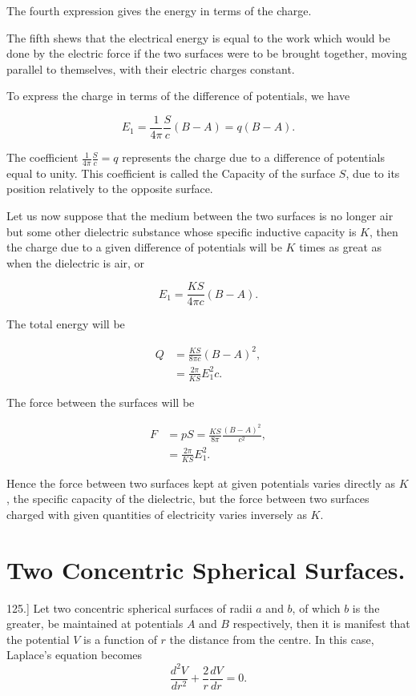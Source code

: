 \documentclass[11pt,a4paper]{article}
\begin{document}
The fourth expression gives the energy in terms of the charge.

The fifth shews that the electrical energy is equal to the work which would be done by the electric force if the two surfaces were to be brought together, moving parallel to themselves, with their electric charges constant.

To express the charge in terms of the difference of potentials, we have

\[
E_1=\frac{1}{4\pi}\frac{S}{c}(B-A)=q(B-A).
\]

The coefficient $\frac{1}{4\pi}\frac{S}{c}=q$ represents the charge due to a difference of potentials equal to unity. This coefficient is called the Capacity of the surface $S$, due to its position relatively to the opposite surface.

Let us now suppose that the medium between the two surfaces is no longer air but some other dielectric substance whose specific inductive capacity is $K$, then the charge due to a given difference of potentials will be $K$ times as great as when the dielectric is air, or

\[
E_1=\frac{KS}{4\pi c}(B-A).
\]

The total energy will be

\[
\begin{aligned}
Q&=\frac{KS}{8\pi c}(B-A)^2,\\
 &=\frac{2\pi}{KS}E_1^2c.
\end{aligned}
\]

The force between the surfaces will be

\[
\begin{aligned}
F&=pS=\frac{KS}{8\pi}\frac{(B-A)^2}{c^2},\\
 &=\frac{2\pi}{KS}E_1^2.
\end{aligned}
\]

Hence the force between two surfaces kept at given potentials varies directly as $K$, the specific capacity of the dielectric, but the force between two surfaces charged with given quantities of electricity varies inversely as $K$.

\section*{Two Concentric Spherical Surfaces.}

125.] Let two concentric spherical surfaces of radii $a$ and $b$, of which $b$ is the greater, be maintained at potentials $A$ and $B$ respectively, then it is manifest that the potential $V$ is a function of $r$ the distance from the centre. In this case, Laplace's equation becomes
\[
\frac{d^2V}{dr^2}+\frac{2}{r}\frac{dV}{dr}=0.
\]
\end{document}
